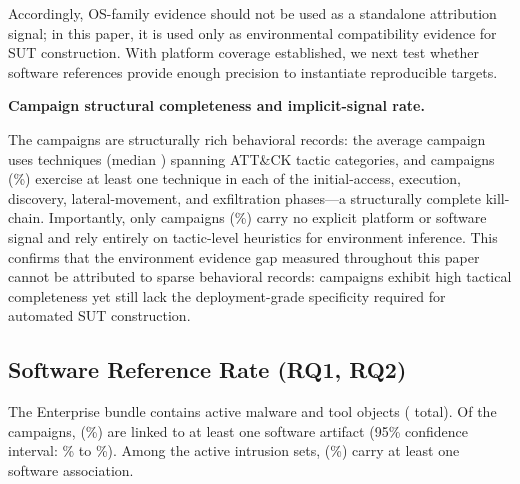 \documentclass[sigconf,anonymous,review]{acmart}
\newcommand{\myparagraph}[1]{\textbf{#1.}\hspace{0.5em}}
\begin{document}
Accordingly, OS-family evidence should not be used as a standalone attribution signal; in this paper, it is used only as environmental compatibility evidence for SUT construction. With platform coverage established, we next test whether software references provide enough precision to instantiate reproducible targets.

\myparagraph{Campaign structural completeness and implicit-signal rate}

The \enterpriseactivecampaigncount{} campaigns are structurally rich behavioral records: the average campaign uses \campaignmeantechniquecount{} techniques (median \campaignmediantechniquecount{}) spanning \campaignmeantacticcoverage{} ATT\&CK tactic categories, and \campaigncompletekillchaincount{} campaigns (\campaigncompletekillchainpct\%) exercise at least one technique in each of the initial-access, execution, discovery, lateral-movement, and exfiltration phases—a structurally complete kill-chain. Importantly, only \ieircount{} campaigns (\ieirpct\%) carry no explicit platform or software signal and rely entirely on tactic-level heuristics for environment inference. This confirms that the environment evidence gap measured throughout this paper cannot be attributed to sparse behavioral records: campaigns exhibit high tactical completeness yet still lack the deployment-grade specificity required for automated SUT construction.

\subsection{Software Reference Rate (RQ1, RQ2)}

The Enterprise bundle contains \enterpriseactivemalwarecount{} active malware and \enterpriseactivetoolcount{} tool objects (\enterpriseactivesoftwarecount{} total). Of the \enterpriseactivecampaigncount{} campaigns, \enterprisecampaignswithsoftwarecount{} (\enterprisecampaignswithsoftwarepercentage\%) are linked to at least one software artifact (95\% confidence interval: \enterprisecampaignswithsoftwarecilow{}\% to \enterprisecampaignswithsoftwarecihigh{}\%). Among the \enterpriseactiveintrusionsetcount{} active intrusion sets, \enterpriseintrusionsetswithsoftwarecount{} (\enterpriseintrusionsetswithsoftwarepercentage\%) carry at least one software association.
\end{document}
